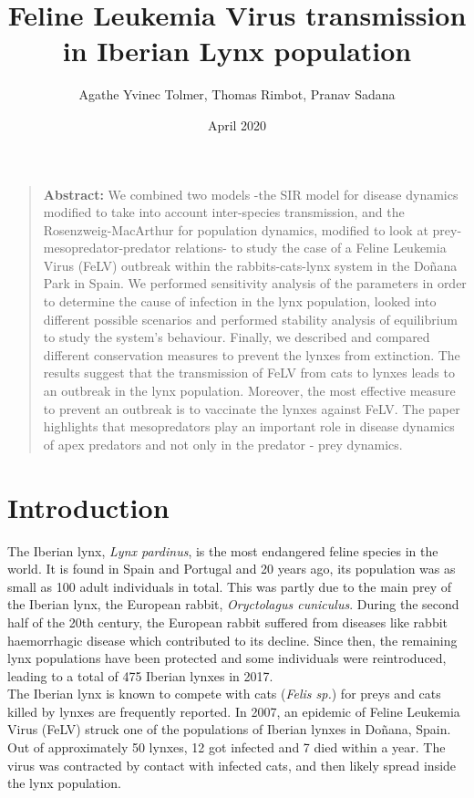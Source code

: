 \documentclass[12pt]{article}
\title{Feline Leukemia Virus transmission in Iberian Lynx population}
\author{Agathe Yvinec Tolmer, Thomas Rimbot, Pranav Sadana}
\date{April 2020}
\begin{document}
\maketitle

\begin{quote}
    {\textbf{Abstract:}}
 We combined two models -the SIR model for disease dynamics modified to take into account inter-species transmission, and the Rosenzweig-MacArthur for population dynamics, modified to look at prey-mesopredator-predator relations- to study the case of a Feline Leukemia Virus (FeLV) outbreak within the rabbits-cats-lynx system in the Doñana Park in Spain. We performed sensitivity analysis of the parameters in order to determine the cause of infection in the lynx population, looked into different possible scenarios and performed stability analysis of equilibrium to study the system's behaviour. Finally, we described and compared different conservation measures to prevent the lynxes from extinction. The results suggest that the transmission of FeLV from cats to lynxes leads to an outbreak in the lynx population. Moreover, the most effective measure to prevent an outbreak is to vaccinate the lynxes against FeLV. The paper highlights that mesopredators play an important role in disease dynamics of apex predators and not only in the predator - prey dynamics. 
\end{quote}
\vfill\eject

\tableofcontents

\vfill\eject
\section{Introduction}
\quad The Iberian lynx, \emph{Lynx pardinus}, is the most endangered feline species in the world. It is found in Spain and Portugal and 20 years ago, its population was as small as 100 adult individuals in total. This was partly due to the main prey of the Iberian lynx, the European rabbit, \emph{Oryctolagus cuniculus}. During the second half of the 20th century, the European rabbit suffered from diseases like rabbit haemorrhagic disease which contributed to its decline. Since then, the remaining lynx populations have been protected and some individuals were reintroduced, leading to a total of 475 Iberian lynxes in 2017\cite{noauthor_iberian_nodate}.\\

\quad The Iberian lynx is known to compete with cats (\emph{Felis sp.}) for preys and cats killed by lynxes are frequently reported. In 2007, an epidemic of Feline Leukemia Virus (FeLV) struck one of the populations of Iberian lynxes in Doñana, Spain. Out of approximately 50 lynxes, 12 got infected and 7 died within a year\cite{meli_feline_2010}. The virus was contracted by contact with infected cats, and then likely spread inside the lynx population. \\
\end{document}

